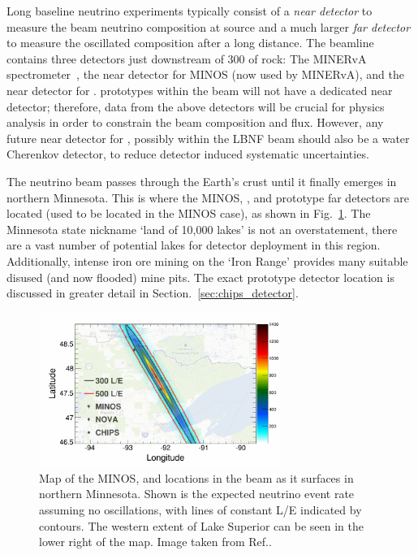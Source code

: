 Long baseline neutrino experiments typically consist of a \emph{near detector} to measure the beam
neutrino composition at source and a much larger \emph{far detector} to measure the oscillated
composition after a long distance. The \numi beamline contains three detectors just downstream of
\unit{300}{} of rock: The MINERvA spectrometer~\cite{mcfarland2006}, the near detector
for MINOS (now used by MINERvA), and the near detector for \nova. \chips prototypes within the
\numi beam will not have a dedicated near detector; therefore, data from the above detectors will
be crucial for physics analysis in order to constrain the beam composition and flux. However, any
future near detector for \chips, possibly within the LBNF beam should also be a water Cherenkov
detector, to reduce detector induced systematic uncertainties.

The \numi neutrino beam passes through the Earth's crust until it finally emerges in northern
Minnesota. This is where the MINOS, \nova, and prototype \chips far detectors are located (used to
be located in the MINOS case), as shown in Fig.~\ref{fig:numi_map}. The Minnesota state nickname
`land of 10,000 lakes' is not an overstatement, there are a vast number of potential lakes for
\chips detector deployment in this region. Additionally, intense iron ore mining on the `Iron
Range' provides many suitable disused (and now flooded) mine pits. The exact \chipsfive prototype
detector location is discussed in greater detail in Section.~\ref{sec:chips_detector}.

\begin{figure} %
    \includegraphics[width=0.7\textwidth]{diagrams/4-chips/numi_map.png}
    \caption[Map of detector locations in the \numi beam.]
    {Map of the MINOS, \nova and \chips locations in the \numi beam as it surfaces in northern
        Minnesota. Shown is the expected neutrino event rate assuming no oscillations, with lines
        of constant L/E indicated by contours. The western extent of Lake Superior can be seen in
        the lower right of the map. Image taken from Ref.\cite{adamson2013}.}
    \label{fig:numi_map}
\end{figure}

